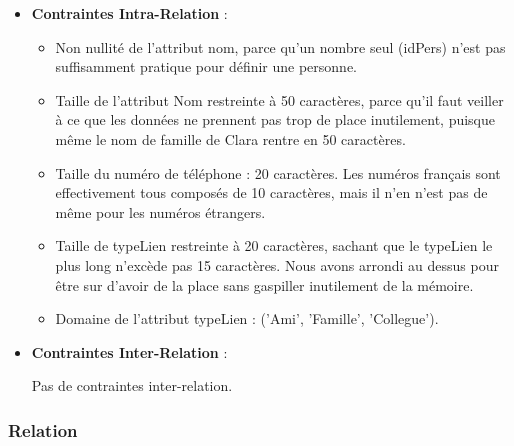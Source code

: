 \documentclass[a4paper,10pt]{report}
\begin{document}
 \begin{itemize}
 	
	\item \textbf{Contraintes Intra-Relation} :
		 \begin{itemize}
		 	\item Non nullité de l'attribut nom, parce qu'un nombre seul (idPers) n'est pas suffisamment pratique pour définir une personne.
			\item Taille de l'attribut Nom restreinte à 50 caractères, parce qu'il faut veiller à ce que les données ne prennent pas trop de place inutilement, puisque même le nom de famille de Clara rentre en 50 caractères.
			\item Taille du numéro de téléphone : 20 caractères. Les numéros français sont effectivement tous composés de 10 caractères, mais il n'en n'est pas de même pour les numéros étrangers.
			\item Taille de typeLien restreinte à 20 caractères, sachant que le typeLien le plus long n'excède pas 15 caractères. Nous avons arrondi au dessus pour être sur d'avoir de la place sans gaspiller inutilement de la mémoire.
			\item Domaine de l'attribut typeLien : ('Ami', 'Famille', 'Collegue'). \\
			
		 \end{itemize}
 	\item  \textbf{Contraintes Inter-Relation} :

Pas de contraintes inter-relation.

 
 \end{itemize}
	
 \subsubsection{Relation }
\end{document}
